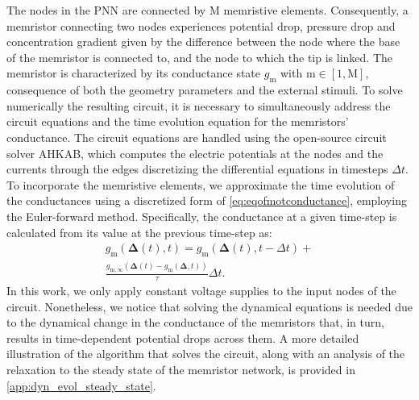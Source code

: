 \documentclass[reprint,superscriptaddress,prb,showkeys]{revtex4-2}
\newcommand{\m}{\text{m}} %
\newcommand{\M}{\text{M}} %
\newcommand{\brac}[1]{\left(#1 \right)} %
\begin{document}
The nodes in the PNN are connected by $\M$ memristive elements. Consequently, a memristor connecting two nodes experiences potential drop, pressure drop and concentration gradient given by the difference between the node where the base of the memristor is connected to, and the node to which the tip is linked. The memristor is characterized by its conductance state $g_{\m}$ with $\m\in[1,\M]$, consequence of both the geometry parameters and the external stimuli.
To solve numerically the resulting circuit, it is necessary to simultaneously address the circuit equations and the time evolution equation for the memristors' conductance. 
The circuit equations are handled using the open-source circuit solver \textsc{AHKAB}\cite{}, which computes the electric potentials at the nodes and the currents through the edges discretizing the differential equations in timesteps $\Delta t$. To incorporate the memristive elements, we approximate the time evolution of the conductances using a discretized form of \cref{eq:eqofmotconductance}, employing the Euler-forward method. Specifically, the conductance at a given time-step is calculated from its value at the previous time-step as:
\begin{multline}
    g_{\m}\brac{\boldsymbol{\Delta}(t), t} = g_{\m}\brac{\boldsymbol{\Delta}(t), t-\Delta t} + \\
    \frac{g_{\m,\infty}\brac{\boldsymbol{\Delta}(t)-g_{\m}\brac{\boldsymbol{\Delta}, t}}}{\tau}\Delta t.
\end{multline}
In this work, we only apply constant voltage supplies to the input nodes of the circuit. Nonetheless, we notice that solving the dynamical equations is needed due to the dynamical change in the conductance of the memristors that, in turn, results in time-dependent potential drops across them. A more detailed illustration of the algorithm that solves the circuit, along with an analysis of the relaxation to the steady state of the memristor network, is provided in \cref{app:dyn_evol_steady_state}.
\end{document}
